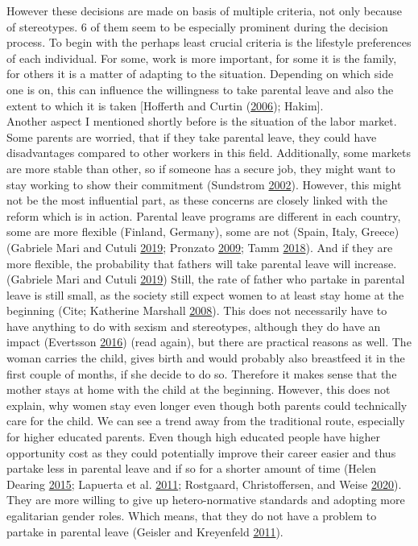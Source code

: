 \documentclass[
  12pt,
]{article}
\begin{document}
However these decisions are made on basis of multiple criteria, not only because of stereotypes. 6 of them seem to be especially prominent during the decision process.
To begin with the perhaps least crucial criteria is the lifestyle preferences of each individual. For some, work is more important, for some it is the family, for others it is a matter of adapting to the situation. Depending on which side one is on, this can influence the willingness to take parental leave and also the extent to which it is taken {[}Hofferth and Curtin (\protect\hyperlink{ref-hofferth_parental_2006}{2006}); Hakim{]}.\\
Another aspect I mentioned shortly before is the situation of the labor market. Some parents are worried, that if they take parental leave, they could have disadvantages compared to other workers in this field. Additionally, some markets are more stable than other, so if someone has a secure job, they might want to stay working to show their commitment (Sundstrom \protect\hyperlink{ref-sundstrom_gender_2002}{2002}).
However, this might not be the most influential part, as these concerns are closely linked with the reform which is in action. Parental leave programs are different in each country, some are more flexible (Finland, Germany), some are not (Spain, Italy, Greece) (Gabriele Mari and Cutuli \protect\hyperlink{ref-gabriele_mari_parental_2019}{2019}; Pronzato \protect\hyperlink{ref-pronzato_return_2009}{2009}; Tamm \protect\hyperlink{ref-tamm_fathers_2018}{2018}). And if they are more flexible, the probability that fathers will take parental leave will increase. (Gabriele Mari and Cutuli \protect\hyperlink{ref-gabriele_mari_parental_2019}{2019})
Still, the rate of father who partake in parental leave is still small, as the society still expect women to at least stay home at the beginning (Cite; Katherine Marshall \protect\hyperlink{ref-katherine_marshall_fathers_2008}{2008}). This does not necessarily have to have anything to do with sexism and stereotypes, although they do have an impact (Evertsson \protect\hyperlink{ref-evertsson_parental_2016}{2016}) (read again), but there are practical reasons as well. The woman carries the child, gives birth and would probably also breastfeed it in the first couple of months, if she decide to do so. Therefore it makes sense that the mother stays at home with the child at the beginning. However, this does not explain, why women stay even longer even though both parents could technically care for the child.
We can see a trend away from the traditional route, especially for higher educated parents. Even though high educated people have higher opportunity cost as they could potentially improve their career easier and thus partake less in parental leave and if so for a shorter amount of time (Helen Dearing \protect\hyperlink{ref-helen_dearing_does_2015}{2015}; Lapuerta et al. \protect\hyperlink{ref-lapuerta_individual_2011}{2011}; Rostgaard, Christoffersen, and Weise \protect\hyperlink{ref-rostgaard_parental_2020}{2020}). They are more willing to give up hetero-normative standards and adopting more egalitarian gender roles. Which means, that they do not have a problem to partake in parental leave (Geisler and Kreyenfeld \protect\hyperlink{ref-geisler_against_2011}{2011}).
\end{document}
